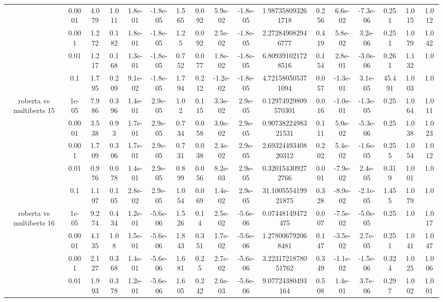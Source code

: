 \begin{tabular}{|c|c|c|c|c|c|c|c|c|c|c|c|c|c|c|c|c|}
 & 0.0001 & 4.079 & 1.011 & 1.8e-01 & -1.8e-05 & 1.565 & 0.092 & 5.9e-02 & -1.8e-05 & 1.987358093261718 & 0.256 & 6.6e-02 & -7.3e-06 & 0.251 & 1.015 & 1.012 \\
 & 0.001 & 1.272 & 0.182 & 1.8e-01 & -1.8e-05 & 1.25 & 0.092 & 2.5e-02 & -1.8e-05 & 2.272849082946777 & 0.419 & 5.8e-02 & 3.2e-06 & 0.251 & 1.079 & 1.042 \\
 & 0.01 & 1.217 & 0.168 & 1.3e-01 & -1.8e-05 & 0.752 & 0.077 & 1.8e-02 & -1.8e-05 & 6.809391021728516 & 0.154 & 2.8e-01 & -3.0e-06 & 0.261 & 1.132 & 1.0 \\
 & 0.1 & 1.795 & 0.209 & 9.1e-02 & -1.8e-05 & 1.794 & 0.212 & -1.2e-02 & -1.8e-05 & 4.721580505371094 & 0.057 & -1.3e-01 & 3.1e-05 & 45.491 & 1.003 & 1.0 \\
\hline
\multirow{5}{*}{roberta  vs multiberts 15} & 1e-05 & 7.986 & 0.396 & 1.4e-01 & 2.9e-05 & 1.02 & 0.115 & 3.3e-02 & 2.9e-05 & 0.12974929809570301 & 0.016 & -1.0e-01 & -1.3e-05 & 0.25 & 1.064 & 1.011 \\
 & 0.0001 & 3.538 & 0.93 & 1.7e-01 & 2.9e-05 & 0.734 & 0.058 & 3.0e-02 & 2.9e-05 & 0.9073822498321531 & 0.111 & 5.0e-02 & -5.3e-06 & 0.25 & 1.038 & 1.023 \\
 & 0.001 & 1.709 & 0.306 & 1.7e-01 & 2.9e-05 & 0.731 & 0.038 & 2.4e-02 & 2.9e-05 & 2.6932449340820312 & 0.202 & 5.4e-02 & -1.6e-05 & 0.255 & 1.054 & 1.012 \\
 & 0.01 & 0.976 & 0.078 & 1.4e-01 & 2.9e-05 & 0.899 & 0.056 & 8.2e-03 & 2.9e-05 & 0.320154309272766 & 0.001 & -7.9e-02 & 2.4e-05 & 0.319 & 1.001 & 1.0 \\
 & 0.1 & 1.197 & 0.105 & 2.8e-02 & 2.9e-05 & 1.054 & 0.069 & 1.4e-02 & 2.9e-05 & 31.100555419921875 & 0.328 & -8.9e-02 & -2.1e-05 & 1.455 & 1.079 & 1.0 \\
\hline
\multirow{5}{*}{roberta  vs multiberts 16} & 1e-05 & 9.274 & 0.434 & 1.2e-01 & -5.6e-06 & 1.526 & 0.14 & 2.5e-02 & -5.6e-06 & 0.07448149472475 & 0.007 & -7.5e-02 & -5.0e-05 & 0.25 & 1.0 & 1.017 \\
 & 0.0001 & 4.135 & 1.08 & 1.5e-01 & -5.6e-06 & 1.843 & 0.351 & 1.7e-02 & -5.6e-06 & 1.278006792068481 & 0.147 & -3.5e-02 & 2.7e-05 & 0.251 & 1.041 & 1.047 \\
 & 0.001 & 2.127 & 0.368 & 1.4e-01 & -5.6e-06 & 1.681 & 0.25 & 2.7e-02 & -5.6e-06 & 3.2231721878051762 & 0.349 & -1.1e-02 & -1.5e-06 & 0.324 & 1.025 & 1.006 \\
 & 0.01 & 1.993 & 0.378 & 1.2e-01 & -5.6e-06 & 1.605 & 0.242 & 2.6e-03 & -5.6e-06 & 9.07724380493164 & 0.508 & 1.4e-01 & 3.7e-06 & 0.297 & 1.002 & 1.001 \\

\end{tabular}
